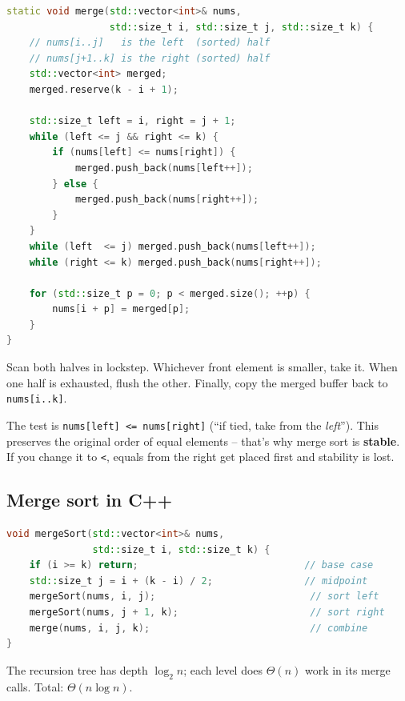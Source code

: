 \documentclass[11pt]{article}
\begin{document}
\begin{examplebox}
\begin{lstlisting}[basicstyle=\ttfamily\small,frame=single,language=C++]
static void merge(std::vector<int>& nums,
                  std::size_t i, std::size_t j, std::size_t k) {
    // nums[i..j]   is the left  (sorted) half
    // nums[j+1..k] is the right (sorted) half
    std::vector<int> merged;
    merged.reserve(k - i + 1);

    std::size_t left = i, right = j + 1;
    while (left <= j && right <= k) {
        if (nums[left] <= nums[right]) {
            merged.push_back(nums[left++]);
        } else {
            merged.push_back(nums[right++]);
        }
    }
    while (left  <= j) merged.push_back(nums[left++]);
    while (right <= k) merged.push_back(nums[right++]);

    for (std::size_t p = 0; p < merged.size(); ++p) {
        nums[i + p] = merged[p];
    }
}
\end{lstlisting}
Scan both halves in lockstep. Whichever front element is smaller,
take it. When one half is exhausted, flush the other. Finally, copy
the merged buffer back to \texttt{nums[i..k]}.
\end{examplebox}

\begin{warnbox}[Stability lives in the \texttt{<=}]
The test is \texttt{nums[left] <= nums[right]} (``if tied, take from
the \emph{left}''). This preserves the original order of equal
elements -- that's why merge sort is \textbf{stable}. If you change
it to \texttt{<}, equals from the right get placed first and
stability is lost.
\end{warnbox}

\subsection{Merge sort in C++}

\begin{examplebox}
\begin{lstlisting}[basicstyle=\ttfamily\small,frame=single,language=C++]
void mergeSort(std::vector<int>& nums,
               std::size_t i, std::size_t k) {
    if (i >= k) return;                             // base case
    std::size_t j = i + (k - i) / 2;                // midpoint
    mergeSort(nums, i, j);                           // sort left
    mergeSort(nums, j + 1, k);                       // sort right
    merge(nums, i, j, k);                            // combine
}
\end{lstlisting}
The recursion tree has depth $\log_2 n$; each level does $\Theta(n)$
work in its merge calls. Total: $\Theta(n \log n)$.
\end{examplebox}
\end{document}
